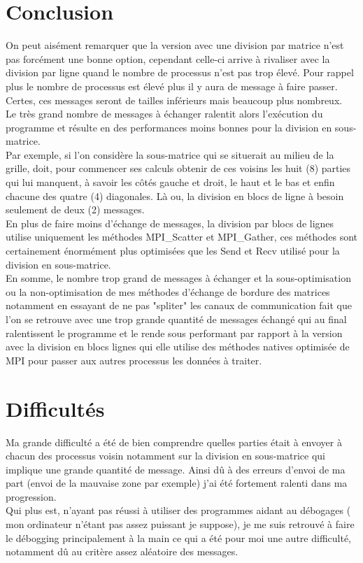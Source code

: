 \documentclass[10pt,a4paper]{article}
\begin{document}
\section{Conclusion}
On peut aisément remarquer que la version avec une division par matrice n'est pas forcément une bonne option, cependant celle-ci arrive à rivaliser avec la division par ligne quand le nombre de processus n'est pas trop élevé. Pour rappel plus le nombre de processus est élevé plus il y aura de message à faire passer. Certes, ces messages seront de tailles inférieurs mais beaucoup plus nombreux.\\
Le très grand nombre de messages à échanger ralentit alors l'exécution du programme et résulte en des performances moins bonnes pour la division en sous-matrice.\\

Par exemple, si l'on considère la sous-matrice qui se situerait au milieu de la grille, doit, pour commencer ses calculs obtenir de ces voisins les huit (8) parties qui lui manquent, à savoir les côtés gauche et droit, le haut et le bas et enfin chacune des quatre (4) diagonales. Là ou, la division en blocs de ligne à besoin seulement de deux (2) messages. \\

En plus de faire moins d'échange de messages, la division par blocs de lignes utilise uniquement les méthodes MPI\_Scatter et MPI\_Gather, ces méthodes sont certainement énormément plus optimisées que les Send et Recv utilisé pour la division en sous-matrice.\\

En somme, le nombre trop grand de messages à échanger et la sous-optimisation ou la non-optimisation de mes méthodes d'échange de bordure des matrices notamment en essayant de ne pas "spliter" les canaux de communication fait que l'on se retrouve avec une trop grande quantité de messages échangé qui au final ralentissent le programme et le rende sous performant par rapport à la version avec la division en blocs lignes qui elle utilise des méthodes natives optimisée de MPI pour passer aux autres processus les données à traiter. 

\section{Difficultés}
Ma grande difficulté a été de bien comprendre quelles parties était à envoyer à chacun des processus voisin notamment sur la division en sous-matrice qui implique une grande quantité de message. Ainsi dû à des erreurs d'envoi de ma part (envoi de la mauvaise zone par exemple) j'ai été fortement ralenti dans ma progression. \\

Qui plus est, n'ayant pas réussi à utiliser des programmes aidant au débogages ( mon ordinateur n'étant pas assez puissant je suppose), je me suis retrouvé à faire le débogging principalement à la main ce qui a été pour moi une autre difficulté, notamment dû au critère assez aléatoire des messages.
\end{document}
